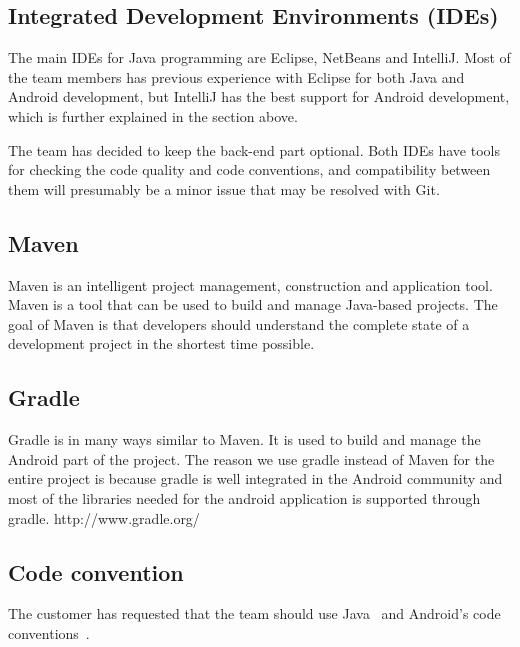 \subsection{Integrated Development Environments (IDEs)}
The main IDEs for Java programming are Eclipse, NetBeans and IntelliJ. Most of the team members has previous experience with Eclipse for both Java and Android development, but IntelliJ has the best support for Android development, which is further explained in the section above.

The team has decided to keep the back-end part optional. Both IDEs have tools for checking the code quality and code conventions, and compatibility between them will presumably be a minor issue that may be resolved with Git.

\subsection{Maven}
Maven is an intelligent project management, construction and application tool. Maven is a tool that can be used to build and manage Java-based projects. The goal of Maven is that developers should understand the complete state of a development project in the shortest time possible.

\subsection{Gradle}
Gradle is in many ways similar to Maven. It is used to build and manage the Android part of the project. The reason we use gradle instead of Maven for the entire project is because gradle is well integrated in the Android community and most of the libraries needed for the android application is supported through gradle.
http://www.gradle.org/

\subsection{Code convention}
The customer has requested that the team should use Java~\cite{javaconv} and Android's code conventions~\cite{androidconv}.

